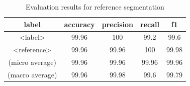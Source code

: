 \label{subsec:refextract}
\begin{table}[h]
\begin{center}
\begin{tabular}{|c|cccc|}
\hline
label		&accuracy	&precision	&recall		&f1 \\
\hline
<label>		&99.96		&100		&99.2		&99.6\\
<reference>		&99.96		&99.96		&100		&99.98\\
\hline
(micro average) & 99.96		&99.96		&99.96		&99.96	\\
(macro average) &	99.96 & 99.98	& 99.6 & 99.79	\\
\hline
\end{tabular}
\caption[Evaluation results for reference segmentation]{Evaluation results for reference segmentation}
\label{table:referencesegmenterresults}
\end{center}
\end{table}


